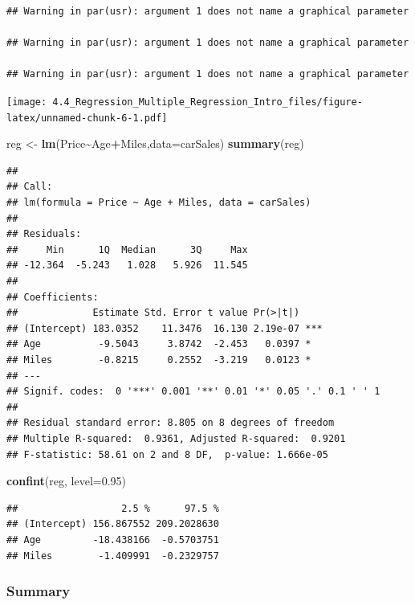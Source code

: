 \documentclass[
]{article}
\newenvironment{Shaded}{\begin{snugshade}}{\end{snugshade}}
\newcommand{\AttributeTok}[1]{\textcolor[rgb]{0.13,0.29,0.53}{#1}}
\newcommand{\FloatTok}[1]{\textcolor[rgb]{0.00,0.00,0.81}{#1}}
\newcommand{\FunctionTok}[1]{\textcolor[rgb]{0.13,0.29,0.53}{\textbf{#1}}}
\newcommand{\NormalTok}[1]{#1}
\newcommand{\OtherTok}[1]{\textcolor[rgb]{0.56,0.35,0.01}{#1}}
\newcommand{\SpecialCharTok}[1]{\textcolor[rgb]{0.81,0.36,0.00}{\textbf{#1}}}
\begin{document}
\begin{verbatim}
## Warning in par(usr): argument 1 does not name a graphical parameter

## Warning in par(usr): argument 1 does not name a graphical parameter

## Warning in par(usr): argument 1 does not name a graphical parameter
\end{verbatim}

\texttt{[image: 4.4\_Regression\_Multiple\_Regression\_Intro\_files/figure-latex/unnamed-chunk-6-1.pdf]}

\begin{Shaded}
\begin{Highlighting}[]
\NormalTok{reg }\OtherTok{\textless{}{-}} \FunctionTok{lm}\NormalTok{(Price}\SpecialCharTok{\textasciitilde{}}\NormalTok{Age}\SpecialCharTok{+}\NormalTok{Miles,}\AttributeTok{data=}\NormalTok{carSales)}
\FunctionTok{summary}\NormalTok{(reg)}
\end{Highlighting}
\end{Shaded}

\begin{verbatim}
## 
## Call:
## lm(formula = Price ~ Age + Miles, data = carSales)
## 
## Residuals:
##     Min      1Q  Median      3Q     Max 
## -12.364  -5.243   1.028   5.926  11.545 
## 
## Coefficients:
##             Estimate Std. Error t value Pr(>|t|)    
## (Intercept) 183.0352    11.3476  16.130 2.19e-07 ***
## Age          -9.5043     3.8742  -2.453   0.0397 *  
## Miles        -0.8215     0.2552  -3.219   0.0123 *  
## ---
## Signif. codes:  0 '***' 0.001 '**' 0.01 '*' 0.05 '.' 0.1 ' ' 1
## 
## Residual standard error: 8.805 on 8 degrees of freedom
## Multiple R-squared:  0.9361, Adjusted R-squared:  0.9201 
## F-statistic: 58.61 on 2 and 8 DF,  p-value: 1.666e-05
\end{verbatim}

\begin{Shaded}
\begin{Highlighting}[]
\FunctionTok{confint}\NormalTok{(reg, }\AttributeTok{level=}\FloatTok{0.95}\NormalTok{)}
\end{Highlighting}
\end{Shaded}

\begin{verbatim}
##                  2.5 %      97.5 %
## (Intercept) 156.867552 209.2028630
## Age         -18.438166  -0.5703751
## Miles        -1.409991  -0.2329757
\end{verbatim}

\hypertarget{summary}{%
\subsubsection{Summary}\label{summary}}
\end{document}
